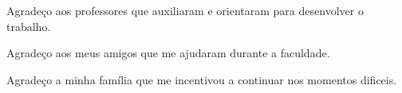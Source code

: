 \begin{agradecimentos}[AGRADECIMENTOS]
Agradeço aos professores que auxiliaram e orientaram para desenvolver
o trabalho.

Agradeço aos meus amigos que me ajudaram durante a faculdade.

Agradeço a minha família que me incentivou a continuar nos momentos dificeis.
\end{agradecimentos}
